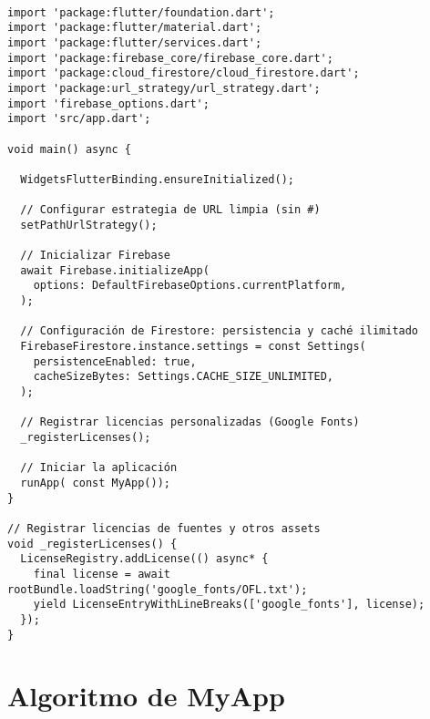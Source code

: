 \begin{verbatim}

import 'package:flutter/foundation.dart';
import 'package:flutter/material.dart';
import 'package:flutter/services.dart';
import 'package:firebase_core/firebase_core.dart';
import 'package:cloud_firestore/cloud_firestore.dart';
import 'package:url_strategy/url_strategy.dart';
import 'firebase_options.dart';
import 'src/app.dart'; 

void main() async {
  
  WidgetsFlutterBinding.ensureInitialized();

  // Configurar estrategia de URL limpia (sin #)
  setPathUrlStrategy();

  // Inicializar Firebase
  await Firebase.initializeApp(
    options: DefaultFirebaseOptions.currentPlatform,
  );

  // Configuración de Firestore: persistencia y caché ilimitado
  FirebaseFirestore.instance.settings = const Settings(
    persistenceEnabled: true,
    cacheSizeBytes: Settings.CACHE_SIZE_UNLIMITED,
  );

  // Registrar licencias personalizadas (Google Fonts)
  _registerLicenses();

  // Iniciar la aplicación
  runApp( const MyApp());
}

// Registrar licencias de fuentes y otros assets
void _registerLicenses() {
  LicenseRegistry.addLicense(() async* {
    final license = await rootBundle.loadString('google_fonts/OFL.txt');
    yield LicenseEntryWithLineBreaks(['google_fonts'], license);
  });
}
\end{verbatim}


\newpage


\section{Algoritmo de MyApp}
\label{anexo:alg4}

